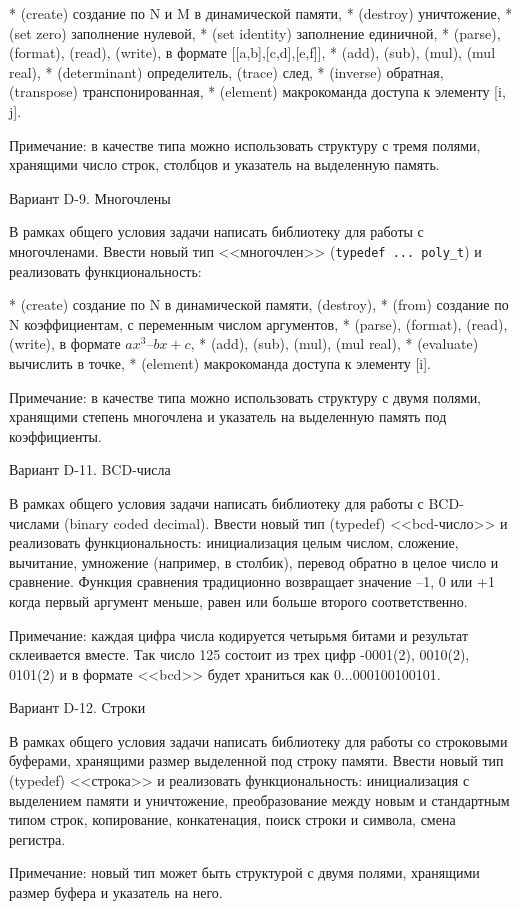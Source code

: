 * (create) создание по N и M в динамической памяти,
* (destroy) уничтожение,
* (set zero) заполнение нулевой,
* (set identity) заполнение единичной, 
* (parse), (format), (read), (write), в формате [[a,b],[c,d],[e,f]],
* (add), (sub), (mul), (mul real),
* (determinant) определитель, (trace) след,
* (inverse) обратная, (transpose) транспонированная,
* (element) макрокоманда доступа к элементу [i, j].

Примечание: в качестве типа можно использовать структуру с тремя полями,
хранящими число строк, столбцов и указатель на выделенную память.


Вариант D-9. Многочлены

В рамках общего условия задачи написать библиотеку для работы с многочленами.
Ввести новый тип <<многочлен>> (\verb|typedef ... poly_t|) и реализовать
функциональность:

* (create) создание по N в динамической памяти, (destroy),
* (from) создание по N коэффициентам, с переменным числом аргументов,
* (parse), (format), (read), (write), в формате $ax^3 – bx + c$,
* (add), (sub), (mul), (mul real),
* (evaluate) вычислить в точке,
* (element) макрокоманда доступа к элементу [i].

Примечание: в качестве типа можно использовать структуру с двумя полями,
хранящими степень многочлена и указатель на выделенную память под
коэффициенты.


Вариант D-11. BCD-числа

В рамках общего условия задачи написать библиотеку для работы с BCD-числами
(binary coded decimal). Ввести новый тип (typedef) <<bcd-число>> и реализовать
функциональность: инициализация целым числом, сложение, вычитание, умножение
(например, в столбик), перевод обратно в целое число и сравнение. Функция
сравнения традиционно возвращает значение –1, 0 или +1 когда первый аргумент
меньше, равен или больше второго соответственно.

Примечание: каждая цифра числа кодируется четырьмя битами и результат
склеивается вместе. Так число 125 состоит из трех цифр -0001(2), 0010(2),
0101(2) и в формате <<bcd>> будет храниться как 0...000100100101.


Вариант D-12. Строки

В рамках общего условия задачи написать библиотеку для работы со строковыми
буферами, хранящими размер выделенной под строку памяти. Ввести новый тип
(typedef) <<строка>> и реализовать функциональность: инициализация с выделением
памяти и уничтожение, преобразование между новым и стандартным типом строк,
копирование, конкатенация, поиск строки и символа, смена регистра.

Примечание: новый тип может быть структурой с двумя полями, хранящими размер
буфера и указатель на него.

